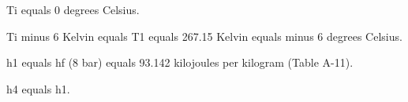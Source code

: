 Ti equals 0 degrees Celsius.  

Ti minus 6 Kelvin equals T1 equals 267.15 Kelvin equals minus 6 degrees Celsius.  

h1 equals hf (8 bar) equals 93.142 kilojoules per kilogram (Table A-11).  

h4 equals h1.